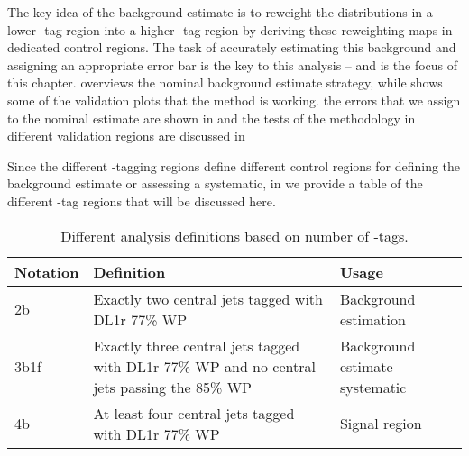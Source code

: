 The key idea of the background estimate is to reweight the distributions in a lower \Pqb-tag region into a higher \Pqb-tag region by deriving these reweighting maps in dedicated control regions. The task of accurately estimating this background and assigning an appropriate error bar is the key to this analysis -- and is the focus of this chapter. 
\Sect{\ref{sec:rw-overview}} overviews the nominal background estimate strategy, while \Sect{\ref{sec:bkg-val-plots}} shows some of the validation plots that the method is working. the errors that we assign to the nominal estimate are shown in \Sect{\ref{sec:bkg-systs}} and the tests of the methodology in different validation regions are discussed in \Sect{\ref{sec:bkg-val-regns}}

Since the different \Pqb-tagging regions define different control regions for defining the background estimate or assessing a systematic, in  we provide a table of the different \Pqb-tag regions that will be discussed here.

\begin{table}[!htbp]
	\centering
	  \begin{tabularx}{\textwidth}{l|X|l}
	  Notation     & Definition & Usage \\
	  \toprule
	  2b    & Exactly two central jets tagged with DL1r 77\% WP & Background estimation \\ \hline
	  3b1f  & Exactly three central jets tagged with DL1r 77\% WP and no central jets passing the 85\% WP & Background estimate systematic \\ \hline
	  4b    & At least four central jets tagged with DL1r 77\% WP & Signal region \\
	  \bottomrule
	  \end{tabularx}
	\caption{Different analysis definitions based on number of \Pqb-tags.}
	\label{tab:b-tag-cat}
  \end{table}%

\clearpage




\FloatBarrier
\clearpage




\FloatBarrier
\clearpage

